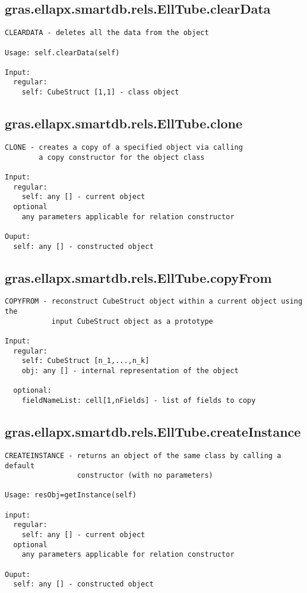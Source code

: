 \subsection{\texorpdfstring{gras.ellapx.smartdb.rels.EllTube.clearData}{clearData}}\label{method:gras.ellapx.smartdb.rels.EllTube.clearData}
\begin{verbatim}
CLEARDATA - deletes all the data from the object

Usage: self.clearData(self)

Input:
  regular:
    self: CubeStruct [1,1] - class object
\end{verbatim}
\subsection{\texorpdfstring{gras.ellapx.smartdb.rels.EllTube.clone}{clone}}\label{method:gras.ellapx.smartdb.rels.EllTube.clone}
\begin{verbatim}
CLONE - creates a copy of a specified object via calling
        a copy constructor for the object class

Input:
  regular:
    self: any [] - current object
  optional
    any parameters applicable for relation constructor

Ouput:
  self: any [] - constructed object
\end{verbatim}
\subsection{\texorpdfstring{gras.ellapx.smartdb.rels.EllTube.copyFrom}{copyFrom}}\label{method:gras.ellapx.smartdb.rels.EllTube.copyFrom}
\begin{verbatim}
COPYFROM - reconstruct CubeStruct object within a current object using the
           input CubeStruct object as a prototype

Input:
  regular:
    self: CubeStruct [n_1,...,n_k]
    obj: any [] - internal representation of the object

  optional:
    fieldNameList: cell[1,nFields] - list of fields to copy
\end{verbatim}
\subsection{\texorpdfstring{gras.ellapx.smartdb.rels.EllTube.createInstance}{createInstance}}\label{method:gras.ellapx.smartdb.rels.EllTube.createInstance}
\begin{verbatim}
CREATEINSTANCE - returns an object of the same class by calling a default
                 constructor (with no parameters)

Usage: resObj=getInstance(self)

input:
  regular:
    self: any [] - current object
  optional
    any parameters applicable for relation constructor

Ouput:
  self: any [] - constructed object
\end{verbatim}
